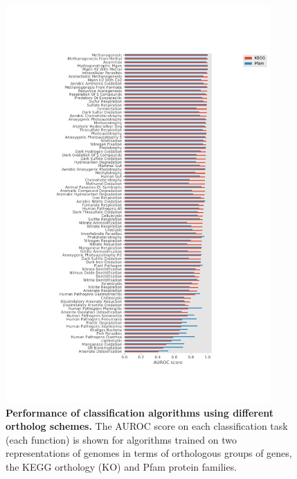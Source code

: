 \documentclass[10pt,letterpaper]{article}
\begin{document}
\begin{figure}[!h]
\includegraphics[width=0.9\textwidth]{orth_compare}
\caption{{\bf Performance of classification algorithms using different ortholog schemes.}
The AUROC score on each classification task (each function) is shown for algorithms trained on two representations of genomes in terms of orthologous groups of genes, the KEGG orthology (KO) and Pfam protein families.}
\label{orth_comp}
\end{figure}
\end{document}
